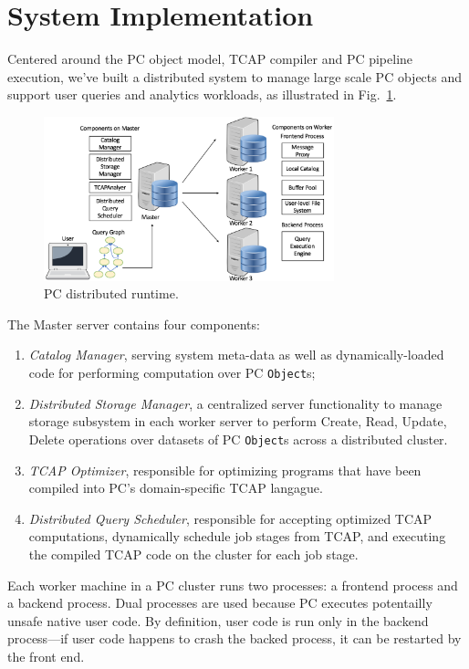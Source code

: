 
\section{System Implementation}
Centered around the PC object model, TCAP compiler and PC pipeline execution, we've built a distributed system to manage large scale PC objects and support user queries and analytics workloads, as illustrated in Fig.~\ref{fig:arch}.

\begin{figure}
\centering
\includegraphics[width=0.75\textwidth]{arch.pdf}
  \caption{\label{fig:arch} PC distributed runtime.}
\end{figure}

The Master server contains four components: 

\begin{enumerate}
\item \emph{Catalog Manager}, serving system meta-data as well as dynamically-loaded code for performing computation over PC \texttt{Object}s;
\item \emph{Distributed Storage Manager}, a centralized server functionality to manage storage subsystem in each worker server to perform Create, Read, Update, Delete operations over datasets of PC \texttt{Object}s across a distributed cluster.
\item \emph{TCAP Optimizer},  responsible for optimizing programs that have been compiled into PC's domain-specific TCAP langague.
\item \emph{Distributed Query Scheduler}, responsible for accepting optimized TCAP computations, dynamically schedule job stages from TCAP, and executing the compiled TCAP code on the cluster for each job stage.
\end{enumerate}

Each worker machine in a PC cluster runs two processes: a frontend process and a backend process.
Dual processes are used because PC executes potentailly unsafe native user code.  By definition, user code is run only in the backend process---if            
user code happens to crash the backed process, it can be restarted by the front end.

